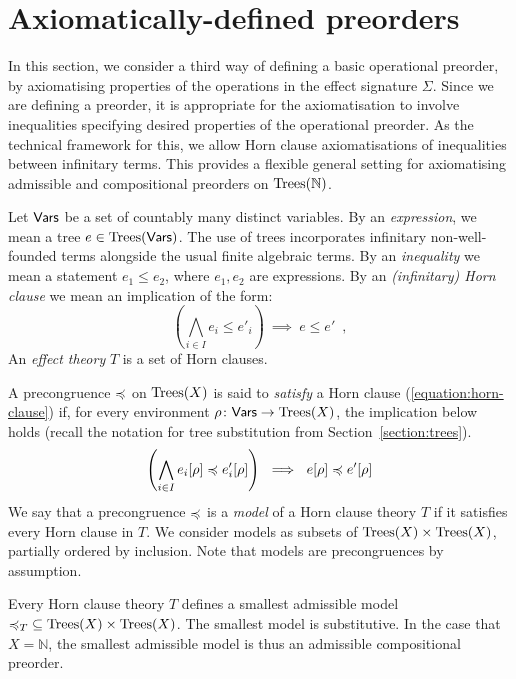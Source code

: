 \section{Axiomatically-defined preorders}
\label{section:axiomatic}

In this section, we consider a third way of defining a basic operational preorder, by axiomatising
properties of the operations in the effect signature $\Sigma$.
Since we are defining a preorder, it is appropriate for the axiomatisation to involve inequalities
specifying desired properties of the operational preorder. As the technical framework for this, we allow
Horn clause axiomatisations of inequalities between infinitary terms.  This provides a flexible general setting for
axiomatising admissible and compositional preorders on 
$\textnormal{Trees}(\mathbb{N})$. 

Let $\mathsf{Vars}$ be a set of countably many distinct variables. By an  \emph{expression}, we mean a
tree $e \in \textnormal{Trees}(\mathsf{Vars})$. The use of trees incorporates infinitary non-well-founded terms alongside the usual finite
algebraic terms. By an \emph{inequality} we mean a statement $e_1 \leq e_2$, where $e_1, e_2$ are expressions.
By an \emph{(infinitary) Horn clause} we mean an implication of the form:
\begin{equation}
\label{equation:horn-clause}
\left( \bigwedge_{i \in I} e_i \leq e'_i \right)~ \implies ~ e \leq e' \enspace ,
\end{equation}
An \emph{effect theory} $T$  is a set of Horn clauses.

A precongruence $\preccurlyeq$ on $\textnormal{Trees}(X)$ is said to \emph{satisfy} a Horn clause (\ref{equation:horn-clause}) if,
for every environment $\rho \colon \mathsf{Vars} \to \textnormal{Trees}(X)$, the implication below holds (recall the notation for tree substitution from Section~\ref{section:trees}).
\[
\left( \bigwedge_{i \in I} e_i[\rho] \preccurlyeq e'_i[\rho] \right) ~ \implies ~  e[\rho] \preccurlyeq e'[\rho] 
\]
We say that a precongruence $\preccurlyeq$ is a \emph{model} of a Horn clause theory $T$ if it satisfies every Horn clause in $T$.
We consider models as subsets of $\textnormal{Trees}(X) \times \textnormal{Trees}(X)$, partially ordered by inclusion. Note that models are precongruences by assumption.
\begin{proposition}
Every Horn clause theory $T$ defines a smallest admissible model  ${\preccurlyeq_T} \subseteq \textnormal{Trees}(X) \times \textnormal{Trees}(X)$. The smallest model
is substitutive. In the case that $X = \mathbb{N}$, the smallest admissible model is thus an
admissible compositional preorder.
\end{proposition}


